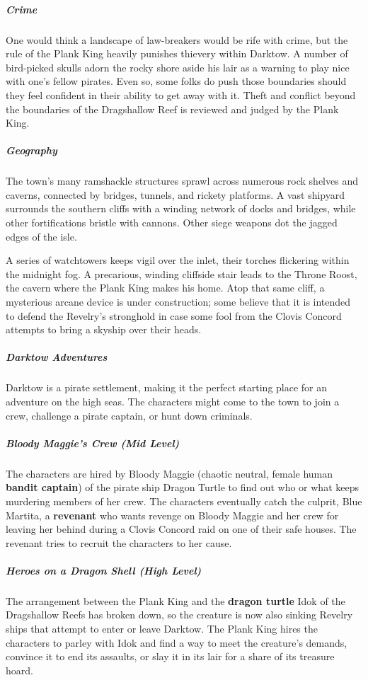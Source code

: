 \documentclass[10pt,a4paper,twoside,bg=print,twocolumn,openany,nodeprecatedcode]{dndbook}
\begin{document}
\subparagraph{Crime}
One would think a landscape of law-breakers would be rife with crime, but the rule of the Plank King heavily punishes thievery within Darktow. A number of bird-picked skulls adorn the rocky shore aside his lair as a warning to play nice with one's fellow pirates. Even so, some folks do push those boundaries should they feel confident in their ability to get away with it. Theft and conflict beyond the boundaries of the Dragshallow Reef is reviewed and judged by the Plank King.

\subparagraph{Geography}
The town's many ramshackle structures sprawl across numerous rock shelves and caverns, connected by bridges, tunnels, and rickety platforms. A vast shipyard surrounds the southern cliffs with a winding network of docks and bridges, while other fortifications bristle with cannons. Other siege weapons dot the jagged edges of the isle.

A series of watchtowers keeps vigil over the inlet, their torches flickering within the midnight fog. A precarious, winding cliffside stair leads to the Throne Roost, the cavern where the Plank King makes his home. Atop that same cliff, a mysterious arcane device is under construction; some believe that it is intended to defend the Revelry's stronghold in case some fool from the Clovis Concord attempts to bring a skyship over their heads.

\subparagraph{Darktow Adventures}
Darktow is a pirate settlement, making it the perfect starting place for an adventure on the high seas. The characters might come to the town to join a crew, challenge a pirate captain, or hunt down criminals.

\subparagraph{Bloody Maggie's Crew (Mid Level)}
The characters are hired by Bloody Maggie (chaotic neutral, female human \textbf{bandit captain}) of the pirate ship Dragon Turtle to find out who or what keeps murdering members of her crew. The characters eventually catch the culprit, Blue Martita, a \textbf{revenant} who wants revenge on Bloody Maggie and her crew for leaving her behind during a Clovis Concord raid on one of their safe houses. The revenant tries to recruit the characters to her cause.

\subparagraph{Heroes on a Dragon Shell (High Level)}
The arrangement between the Plank King and the \textbf{dragon turtle} Idok of the Dragshallow Reefs has broken down, so the creature is now also sinking Revelry ships that attempt to enter or leave Darktow. The Plank King hires the characters to parley with Idok and find a way to meet the creature's demands, convince it to end its assaults, or slay it in its lair for a share of its treasure hoard.
\end{document}
